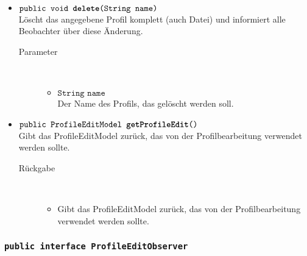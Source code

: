 \begin{description}
\begin{itemize}
		\item $\texttt{public void \textbf{delete}(String name)}$ \\ Löscht das angegebene Profil komplett (auch Datei) und informiert alle Beobachter über diese Änderung.
		\begin{description}
			\item[Parameter] \hfill \\
			\vspace{-.8cm}
			\begin{itemize}
				\item $\texttt{String name}$ \\ Der Name des Profils, das gelöscht werden soll.
			\end{itemize}
		\end{description}
		
		\item $\texttt{public ProfileEditModel \textbf{getProfileEdit}()}$ \\ Gibt das ProfileEditModel zurück, das von der Profilbearbeitung verwendet werden sollte.
		\begin{description}
			\item[Rückgabe] \hfill \\
			\vspace{-.8cm}
			\begin{itemize}
				\item Gibt das ProfileEditModel zurück, das von der Profilbearbeitung verwendet werden sollte.
			\end{itemize}
		\end{description}
	\end{itemize}
\end{description}

\subsubsection{\normalfont \texttt{public interface \textbf{ProfileEditObserver}}}


